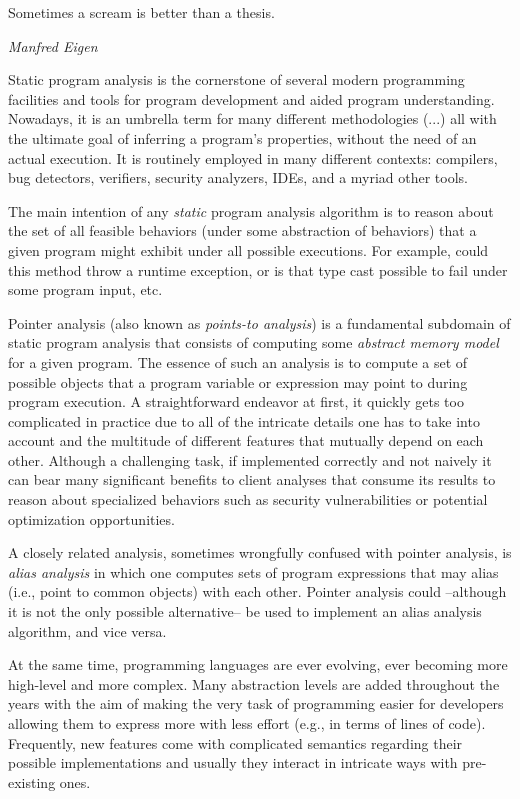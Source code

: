 \label{chapter:intro}

\epigraph{Sometimes a scream is better than a thesis.}{\textit{Manfred Eigen}}

Static program analysis is the cornerstone of several modern programming facilities and tools for program development and aided program understanding. Nowadays, it is an umbrella term for many different methodologies (...) all with the ultimate goal of inferring a program's properties, without the need of an actual execution. It is routinely employed in many different contexts: compilers, bug detectors, verifiers, security analyzers, IDEs, and a myriad other tools. 

The main intention of any \emph{static} program analysis algorithm is to reason about the set of all feasible behaviors (under some abstraction of behaviors) that a given program might exhibit under all possible executions. For example, could this method throw a runtime exception, or is that type cast possible to fail under some program input, etc.

Pointer analysis (also known as \emph{points-to analysis}) is a fundamental subdomain of static program analysis that consists of computing some \emph{abstract memory model} for a given program. The essence of such an analysis is to compute a set of possible objects that a program variable or expression may point to during program execution. A straightforward endeavor at first, it quickly gets too complicated in practice due to all of the intricate details one has to take into account and the multitude of different features that mutually depend on each other. Although a challenging task, if implemented correctly and not naively it can bear many significant benefits to client analyses that consume its results to reason about specialized behaviors such as security vulnerabilities or potential optimization opportunities.

A closely related analysis, sometimes wrongfully confused with pointer analysis, is \emph{alias analysis} in which one computes sets of program expressions that may alias (i.e., point to common objects) with each other. Pointer analysis could --although it is not the only possible alternative-- be used to implement an alias analysis algorithm, and vice versa.

At the same time, programming languages are ever evolving, ever becoming more high-level and more complex. Many abstraction levels are added throughout the years with the aim of making the very task of programming easier for developers allowing them to express more with less effort (e.g., in terms of lines of code). Frequently, new features come with complicated semantics regarding their possible implementations and usually they interact in intricate ways with pre-existing ones.


